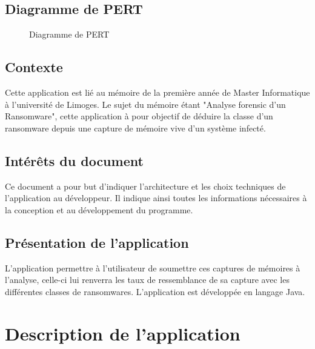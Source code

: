 \documentclass[a4paper, 12pt, twoside]{article}
\begin{document}
\subsection{Diagramme de PERT}
\begin{figure}[h]
  \caption{Diagramme de PERT}
\end{figure}



\subsection{Contexte}
Cette application est lié au mémoire de la première année de Master Informatique à l'université de Limoges. Le sujet du mémoire étant "Analyse forensic d'un Ransomware", cette application à pour objectif de déduire la classe d'un ransomware depuis une capture de mémoire vive d'un système infecté.

\subsection{Intérêts du document}
Ce document a pour but d'indiquer l'architecture et les choix techniques de l'application au développeur. Il indique ainsi toutes les informations nécessaires à la conception et au développement du programme. 

\subsection{Présentation de l'application}
L'application permettre à l'utilisateur de soumettre ces captures de mémoires à l'analyse, celle-ci lui renverra les taux de ressemblance de sa capture avec les différentes classes de ransomwares.
L'application est développée en langage Java.

\section{Description de l'application}
\end{document}
